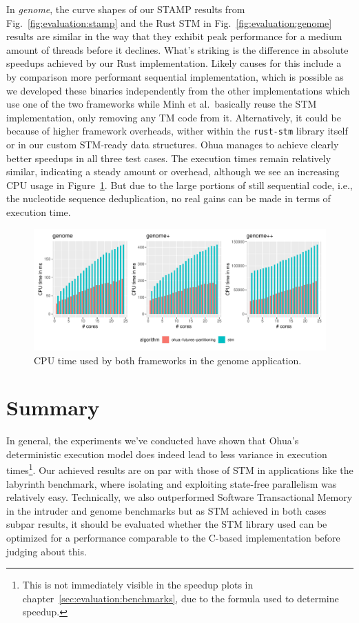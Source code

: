 In \emph{genome}, the curve shapes of our STAMP results from Fig.~\ref{fig:evaluation:stamp} and the Rust STM in Fig.~\ref{fig:evaluation:genome} results are similar in the way that they exhibit peak performance for a medium amount of threads before it declines.
What's striking is the difference in absolute speedups achieved by our Rust implementation.
Likely causes for this include a by comparison more performant sequential implementation, which is possible as we developed these binaries independently from the other implementations which use one of the two frameworks while Minh et al.\ basically reuse the STM implementation, only removing any TM code from it.
Alternatively, it could be because of higher framework overheads, wither within the \texttt{rust-stm} library itself or in our custom STM-ready data structures.
Ohua manages to achieve clearly better speedups in all three test cases.
The execution times remain relatively similar, indicating a steady amount or overhead, although we see an increasing CPU usage in Figure~\ref{fig:evaluation:genome-cpu}.
But due to the large portions of still sequential code, i.e., the nucleotide sequence deduplication, no real gains can be made in terms of execution time.

\begin{figure}
    \centering
    \includegraphics[width=\textwidth,keepaspectratio]{gfx/results/cpu_genome_comb}
    \caption{CPU time used by both frameworks in the genome application.}%
    \label{fig:evaluation:genome-cpu}
\end{figure}


\section{Summary}%
\label{sec:evaluation:summary}

In general, the experiments we've conducted have shown that Ohua's deterministic execution model does indeed lead to less variance in execution times\footnote{This is not immediately visible in the speedup plots in chapter~\ref{sec:evaluation:benchmarks}, due to the formula used to determine speedup.}.
Our achieved results are on par with those of STM in applications like the labyrinth benchmark, where isolating and exploiting state-free parallelism was relatively easy.
Technically, we also outperformed Software Transactional Memory in the intruder and genome benchmarks but as STM achieved in both cases subpar results, it should be evaluated whether the STM library used can be optimized for a performance comparable to the C-based implementation before judging about this.

